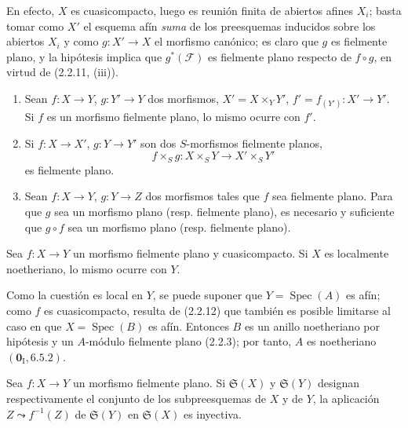 En efecto, $X$ es cuasicompacto, luego es reunión finita de abiertos afines
$X_i$; basta tomar como $X'$ el esquema afín \emph{suma} de los preesquemas
inducidos sobre los abiertos $X_i$ y
como $g:X'\to X$ el morfismo canónico; es claro que $g$ es fielmente plano,
y la hipótesis implica que $g^*(\mathscr F)$ es fielmente plano respecto de
$f\circ g$, en virtud de (2.2.11, (iii)).

\begin{corollary}[2.2.13]
\label{IV.2.2.13-fr}
\begin{enumerate}
\item[\textup{(i)}] Sean $f:X\to Y$, $g:Y'\to Y$ dos morfismos,
$X'=X\times_Y Y'$, $f'=f_{(Y')}:X'\to Y'$. Si $f$ es un morfismo
fielmente plano, lo mismo ocurre con $f'$.
\item[\textup{(ii)}] Si $f:X\to X'$, $g:Y\to Y'$ son dos $S$-morfismos fielmente
planos,
\[
f\times_S g:X\times_S Y\longrightarrow X'\times_S Y'
\]
es fielmente plano.
\item[\textup{(iii)}] Sean $f:X\to Y$, $g:Y\to Z$ dos morfismos tales que $f$ sea
fielmente plano. Para que $g$ sea un morfismo plano \textup{(resp.} fielmente plano),
es necesario y suficiente que $g\circ f$ sea un morfismo plano \textup{(resp.}
fielmente plano).
\end{enumerate}
\end{corollary}

\begin{proposition}[2.2.14]
\label{IV.2.2.14-fr}
Sea $f:X\to Y$ un morfismo fielmente plano y cuasicompacto. Si $X$ es
localmente noetheriano, lo mismo ocurre con $Y$.
\end{proposition}

Como la cuestión es local en $Y$, se puede suponer que
$Y=\operatorname{Spec}(A)$ es afín; como $f$ es cuasicompacto, resulta de
(2.2.12) que también es posible limitarse al caso en que
$X=\operatorname{Spec}(B)$ es afín. Entonces $B$ es un anillo noetheriano
por hipótesis y un $A$-módulo fielmente plano (2.2.3); por tanto, $A$ es
noetheriano $(\mathbf{0}_{\mathrm I},6.5.2)$.

\begin{proposition}[2.2.15]
\label{IV.2.2.15-fr}
Sea $f:X\to Y$ un morfismo fielmente plano. Si $\mathfrak S(X)$ y
$\mathfrak S(Y)$ designan respectivamente el conjunto de los subpreesquemas
de $X$ y de $Y$, la aplicación $Z\leadsto f^{-1}(Z)$ de $\mathfrak S(Y)$ en
$\mathfrak S(X)$ es inyectiva.
\end{proposition}

